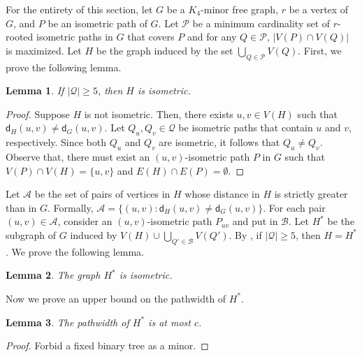\documentclass[a4paper]{article}
\newcommand{\distG}[3]{\mathsf{d}_{#1}\left(#2,#3\right)}
\newtheorem{lemma}{Lemma}
\begin{document}
For the entirety of this section, let $G$ be a $K_4$-minor free graph, $r$ be a vertex of $G$, and $P$ be an isometric path of $G$. Let $\mathcal{P}$ be a minimum cardinality set of $r$-rooted isometric paths in $G$ that covers $P$ and for any $Q\in \mathcal{P}$, $|V(P)\cap V(Q)|$ is maximized. Let $H$ be the graph induced by the set $\displaystyle\bigcup\limits_{Q\in \mathcal{P}} V(Q)$. First, we prove the following lemma.

\begin{lemma}\label{lem:1st-isometric}
	If $|\mathcal{Q}| \geq 5$, then $H$ is isometric.
\end{lemma}
\begin{proof}
	Suppose $H$ is not isometric. Then, there exists $u,v\in V(H)$ such that $\distG{H}{u}{v} \neq \distG{G}{u}{v}$. Let $Q_u,Q_v \in \mathcal{Q}$ be isometric paths that contain $u$ and $v$, respectively. Since both $Q_u$ and $Q_v$ are isometric, it follows that $Q_u\neq Q_v$. Observe that, there must exist an $(u,v)$-isometric path $P$ in $G$ such that $V(P)\cap V(H)=\{u,v\}$ and $E(H)\cap E(P)=\emptyset$. 
\end{proof}

Let $\mathcal{A}$ be the set of pairs of vertices in $H$ whose distance in $H$ is strictly greater than in $G$. Formally, $\mathcal{A}=\{(u,v) \colon \distG{H}{u}{v} \neq \distG{G}{u}{v}  \}$.  For each pair $(u,v)\in \mathcal{A}$, consider an $(u,v)$-isometric path $P_{uv}$ and put in $\mathcal{B}$. Let $H^*$ be the subgraph of $G$ induced by $V(H)\cup \displaystyle\bigcup\limits_{Q'\in \mathcal{B}} V(Q')$.  By , if $|\mathcal{Q}|\geq 5$, then $H=H^*$. We prove the following lemma.

\begin{lemma}\label{lem:2nd-isometric}
	The graph $H^*$ is isometric.
\end{lemma}

Now we prove an upper bound on the pathwidth of $H^*$.

\begin{lemma}
	The pathwidth of $H^*$ is at most $c$. 
\end{lemma}
\begin{proof}
	Forbid a fixed binary tree as a minor.
\end{proof}


\end{document}
